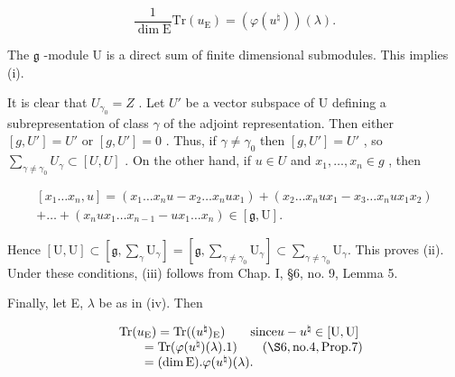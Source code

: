 \[
\frac {1}{\dim \mathrm{E}} \mathrm{Tr} (u _ {\mathrm{E}}) = (\varphi (u ^ {\natural})) (\lambda).
\]

The \(\mathfrak{g}\) -module U is a direct sum of finite dimensional submodules. This implies (i).

It is clear that \(U_{\gamma_{0}} = Z\) . Let \(U'\) be a vector subspace of U defining a subrepresentation of class \(\gamma\) of the adjoint representation. Then either \([g, U'] = U'\) or \([g, U'] = 0\) . Thus, if \(\gamma \neq \gamma_{0}\) then \([g, U'] = U'\) , so \(\sum_{\gamma \neq \gamma_{0}} U_{\gamma} \subset [U, U]\) . On the other hand, if \(u \in U\) and \(x_{1}, \ldots, x_{n} \in g\) , then

\[
\begin{array}{c} [ x _ {1} \ldots x _ {n}, u ] = (x _ {1} \ldots x _ {n} u - x _ {2} \ldots x _ {n} u x _ {1}) + (x _ {2} \ldots x _ {n} u x _ {1} - x _ {3} \ldots x _ {n} u x _ {1} x _ {2}) \\ + \dots + (x _ {n} u x _ {1} \ldots x _ {n - 1} - u x _ {1} \ldots x _ {n}) \in [ \mathfrak {g}, \mathrm{U} ]. \end{array}
\]

Hence \([\mathrm{U},\mathrm{U}]\subset \left[\mathfrak{g},\sum_{\gamma}\mathrm{U}_{\gamma}\right] = \left[\mathfrak{g},\sum_{\gamma \neq \gamma_0}\mathrm{U}_\gamma \right]\subset \sum_{\gamma \neq \gamma_0}\mathrm{U}_\gamma .\) This proves (ii). Under these conditions, (iii) follows from Chap. I, §6, no. 9, Lemma 5.

Finally, let E, \(\lambda\) be as in (iv). Then

\[
\begin{array}{r l} & {\mathrm{Tr} (u _ {\mathrm{E}}) = \mathrm{Tr} ((u ^ {\natural}) _ {\mathrm{E}}) \qquad \text {since} u - u ^ {\natural} \in [ \mathrm{U}, \mathrm{U} ]} \\ & {\qquad = \mathrm{Tr} (\varphi (u ^ {\natural}) (\lambda). 1) \qquad (\S 6, \text {no.} 4, \text {Prop.} 7)} \\ & {\qquad = (\dim \mathrm{E}). \varphi (u ^ {\natural}) (\lambda).} \end{array}
\]

